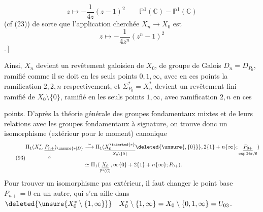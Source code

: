 
\[
z\longmapsto-\frac1{4z}(z-1)^2
\qquad \mathbb P^1(\mathbb C)\mathbin{-}\mathbb P^1(\mathbb C)
\]
(cf (23)) de sorte que l'application cherchée $X_n\longrightarrow X_0$ est
\[
\tag{92}
z\longmapsto-\frac1{4z^n}(z^n-1)^2
\]
.\,]

Ainsi, $X_n$ devient un revêtement galoisien de $X_0$, de groupe de Galois $D_n=D_{P_0}$, ramifié comme il se doit en les seuls points $0,1,\infty$, avec en ces points la ramification $2,2,n$ respectivement, et $\Sigma_{P_0}^*=X_n^*$ devient un revêtement fini ramifié  de $X_0\setminus\{0\}$, ramifié en les seuls points $1,\infty$, avec ramification $2,n$ en ces

points. D'après la théorie générale des groupes fondamentaux mixtes et de leurs relations avec les groupes fondamentaux à signature, on trouve donc un isomorphisme (extérieur pour le moment) canonique
\[
\tag{93}
\begin{aligned}
\Pi_1(X_n^*,\underset{\substack{\Vert\\0}}{\underline{P_{n+}}})_{\unsure{*|D}}
&\overset\sim\longrightarrow
\Pi_1(\underset{X_0\setminus\{0\}}{\underline{X_0^{\inserted{*}}}}\deleted{\unsure{,\{0\}}},2\{1\}+n\{\infty\};\underset{\exp 2i\pi/6}{\underline{P_{0+}}})\\
&\simeq\Pi_1(\underset{\mathbb P^1(\mathbb C)}{\underline{X_0}},\infty\{0\}+2\{1\}+n\{\infty\};P_{0+}).
\end{aligned}
\]
Pour trouver un isomorphisme pas extérieur, il faut changer le point base $P_{n+}=0$ en un autre, qui s'en aille dans
$\deleted{\unsure{X_0^*\setminus\{1,\infty\}}}\quad X_0^*\setminus\{1,\infty\}=X_0\setminus\{0,1,\infty\}=U_{03}$.

